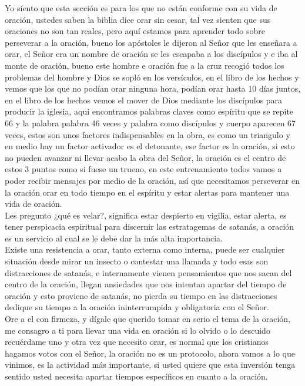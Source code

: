 \documentclass[12pt]{article}
\begin{document}
Yo siento que esta sección es para los que no están conforme con su vida de oración, ustedes saben la biblia dice orar sin cesar, tal vez sienten que sus oraciones no son tan reales, pero aquí estamos para aprender todo sobre perseverar a la oración, bueno los apóstoles le dijeron al Señor que les enseñara a orar, el Señor era un nombre de oración se les escapaba a los discípulos y e iba al monte de oración, bueno este hombre e oración fue a la cruz recogió todos los problemas del hombre y Dios se sopló en los versículos, en el libro de los hechos y vemos que los que no podían orar ninguna hora, podían orar hasta 10 días juntos, en el libro de los hechos vemos el mover de Dios mediante los discípulos para producir la iglesia, aquí encontramos palabras claves como espíritu que se repite 66 y la palabra palabra 46 veces y palabra como discípulos y cuerpo aparecen 67 veces, estos son unos factores indispensables en la obra, es como un triangulo y en medio hay un factor activador es el detonante, ese factor es la oración, si esto no pueden avanzar ni llevar acabo la obra del Señor, la oración es el centro de estos 3 puntos como si fuese un trueno, en este entrenamiento todos vamos a poder recibir mensajes por medio de la oración, así que necesitamos perseverar en la oración orar en todo tiempo en el espíritu y estar alertas para mantener una vida de oración.\\

Les pregunto ¿qué es velar?, significa estar despierto en vigilia, estar alerta, es tener perspicacia espiritual para discernir las estratagemas de satanás, a oración es un servicio al cual se le debe dar la más alta importancia.\\

Existe una resistencia a orar, tanto externa como interna, puede ser cualquier situación desde mirar un insecto o contestar una llamada y todo esas son distracciones de satanás, e internamente vienen pensamientos que nos sacan del centro de la oración, llegan ansiedades que nos intentan apartar del tiempo de oración y esto proviene de satanás, no pierda su tiempo en las distracciones dedique su tiempo a la oración ininterrumpida y obligatoria con el Señor.\\

Ore a el con firmeza, y dígale que querido tomar en serio el tema de la oración, me consagro a ti para llevar una vida en oración si lo olvido o lo descuido recuérdame uno y otra vez que necesito orar, es normal que los cristianos hagamos votos con el Señor, la oración no es un protocolo, ahora vamos a lo que vinimos, es la actividad más importante, si usted quiere que esta inversión tenga sentido usted necesita apartar tiempos específicos en cuanto a la oración.\\
\end{document}
